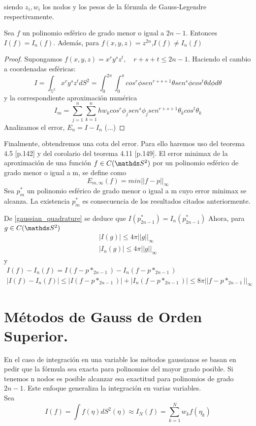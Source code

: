 siendo ${z_i},{w_i}$ los nodos y los pesos de la fórmula de Gauss-Legendre respectivamente.
\begin{thm}Sea $f$ un polinomio esférico de grado menor o igual a $2n-1$. Entonces $I(f)=I_n(f)$. Además, para $f(x,y,z) = z^{2n}$,$I(f)\neq I_n(f)$
 	
\end{thm}
\begin{proof}
	
	Supongamos $f(x,y,z)= x^ry^sz^t, \quad r+s+t \le 2n-1$. Haciendo el cambio a coordenadas esféricas:
	$$
	I = \int_{\mathds{S}^2} x^ry^sz^t dS^2 = \int_{0}^{2\pi} \int_{0}^{\pi} cos^r\phi sen^{r+s+1}\theta sen^s \phi cos^t \theta d\phi d\theta
	$$
	y la correspondiente aproximación numérica
	$$
	I_m = \sum_{j=1}^{n} \sum_{k=1}^{n} h w_k cos^r \phi_j sen^s \phi_j sen^{r+s+1}\theta_k cos^t \theta_k
	$$
	Analizamos el error, $ E_n = I-I_n $
	(...)
\end{proof}
Finalmente, obtendremos una cota del error. Para ello haremos uso del teorema 4.5 [p.142] y del corolario del teorema 4.11 [p.149].
\medskip
El error minimax de la aproximación de una función $f\in C(\esfera)$ por un polinomio esférico de grado menor o igual a m, se define como 
$$
E_{m,\infty}(f) = min ||f-p||_{\infty}
$$
Sea $p_m^*$ un polinomio esférico de grado menor o igual a m cuyo error minimax se alcanza. La existencia $p_m^*$ es consecuencia de los resultados citados anteriormente.

De \ref{gaussian_quadrature} se deduce que $I(p_{2n-1}^*)=I_n(p_{2n-1}^*)$
Ahora, para $g\in C(\esfera)$
\begin{gather}
|I(g)| \le 4\pi||g||_\infty \\
|I_n(g)|\le 4\pi||g||_\infty
\end{gather}
y
\begin{gather}
I(f) - I_n(f) = I(f-p*_{2n-1}) - I_n(f-p*_{2n-1}) \\
|I(f) - I_n(f)| \le | I(f-p*_{2n-1}) | + |  I_n(f-p*_{2n-1}) | \le 8\pi||f-p*_{2n-1}||_\infty
\end{gather}
\section{Métodos de Gauss de Orden Superior.}

En el caso de integración en una variable los métodos gaussianos se basan en pedir que la fórmula sea exacta para polinomios del mayor grado posible. Si tenemos n nodos es posible alcanzar esa exactitud para polinomios de grado $2n-1$. Este enfoque generaliza la integración en varias variables. \\
Sea $$
I(f)= \int f(\eta)dS^2(\eta) \approx I_N(f) = \sum_{k=1}^{N} w_kf(\eta_k)$$

